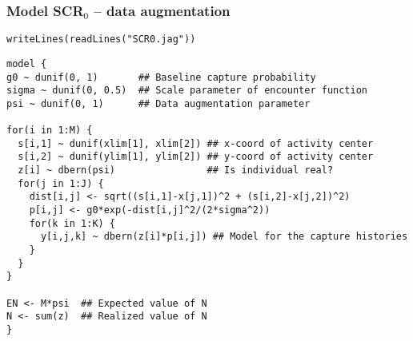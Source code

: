 \documentclass[color=usenames,dvipsnames]{beamer}\usepackage[]{graphicx}\usepackage[]{xcolor}
\makeatletter
\newcommand{\hlsng}[1]{\textcolor[rgb]{0.749,0.012,0.012}{#1}}%
\newcommand{\hldef}[1]{\textcolor[rgb]{0,0,0}{#1}}%
\newcommand{\hlkwd}[1]{\textcolor[rgb]{0.004,0.004,0.506}{#1}}%
\newenvironment{kframe}{%
 \def\at@end@of@kframe{}%
 \ifinner\ifhmode%
  \def\at@end@of@kframe{\end{minipage}}%
  \begin{minipage}{\columnwidth}%
 \fi\fi%
 \def\FrameCommand##1{\hskip\@totalleftmargin \hskip-\fboxsep
 \colorbox{shadecolor}{##1}\hskip-\fboxsep
     \hskip-\linewidth \hskip-\@totalleftmargin \hskip\columnwidth}%
 \MakeFramed {\advance\hsize-\width
   \@totalleftmargin\z@ \linewidth\hsize
   \@setminipage}}%
 {\par\unskip\endMakeFramed%
 \at@end@of@kframe}
\newenvironment{knitrout}{}{} %
\makeatother
\begin{document}
\begin{frame}[fragile]
  \frametitle{Model SCR$_0$ -- data augmentation}
\vspace{-3pt}
\begin{knitrout}\scriptsize
{}\color{fgcolor}\begin{kframe}
\begin{alltt}
\hlkwd{writeLines}\hldef{(}\hlkwd{readLines}\hldef{(}\hlsng{"SCR0.jag"}\hldef{))}
\end{alltt}
\end{kframe}
\end{knitrout}
\begin{knitrout}\scriptsize
{}\color{fgcolor}\begin{kframe}
\begin{verbatim}
model {
g0 ~ dunif(0, 1)       ## Baseline capture probability
sigma ~ dunif(0, 0.5)  ## Scale parameter of encounter function
psi ~ dunif(0, 1)      ## Data augmentation parameter

for(i in 1:M) {
  s[i,1] ~ dunif(xlim[1], xlim[2]) ## x-coord of activity center
  s[i,2] ~ dunif(ylim[1], ylim[2]) ## y-coord of activity center
  z[i] ~ dbern(psi)                ## Is individual real?
  for(j in 1:J) {
    dist[i,j] <- sqrt((s[i,1]-x[j,1])^2 + (s[i,2]-x[j,2])^2)
    p[i,j] <- g0*exp(-dist[i,j]^2/(2*sigma^2))
    for(k in 1:K) {
      y[i,j,k] ~ dbern(z[i]*p[i,j]) ## Model for the capture histories
    }
  }
}

EN <- M*psi  ## Expected value of N
N <- sum(z)  ## Realized value of N
}
\end{verbatim}
\end{kframe}
\end{knitrout}
\end{frame}
\end{document}

